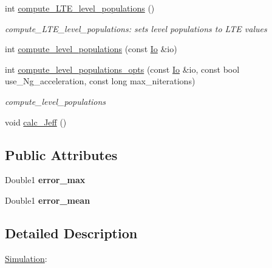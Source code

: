 \begin{DoxyCompactItemize}
\mbox{\label{structSimulation_a3049c252acbb537a7f7db6caf59520ec}} 
int \mbox{\hyperlink{structSimulation_a3049c252acbb537a7f7db6caf59520ec}{compute\+\_\+\+L\+T\+E\+\_\+level\+\_\+populations}} ()
\begin{DoxyCompactList}\small\item\em compute\+\_\+\+L\+T\+E\+\_\+level\+\_\+populations\+: sets level populations to L\+TE values \end{DoxyCompactList}\item 
int \mbox{\hyperlink{structSimulation_a32a1ff3404a290a95b9b3db2cbffba68}{compute\+\_\+level\+\_\+populations}} (const \mbox{\hyperlink{structIo}{Io}} \&io)
\item 
\mbox{\label{structSimulation_ae489db8cfd872f168b0dfd3519b3ec11}} 
int \mbox{\hyperlink{structSimulation_ae489db8cfd872f168b0dfd3519b3ec11}{compute\+\_\+level\+\_\+populations\+\_\+opts}} (const \mbox{\hyperlink{structIo}{Io}} \&io, const bool use\+\_\+\+Ng\+\_\+acceleration, const long max\+\_\+niterations)
\begin{DoxyCompactList}\small\item\em compute\+\_\+level\+\_\+populations \end{DoxyCompactList}\item 
void \mbox{\hyperlink{structSimulation_a8f68d28f188303845cab9e16f8512819}{calc\+\_\+\+Jeff}} ()
\end{DoxyCompactItemize}
\subsection*{Public Attributes}
\begin{DoxyCompactItemize}
\item 
\mbox{\label{structSimulation_a8f1af666ff7c205e94e555a799f51184}} 
Double1 {\bfseries error\+\_\+max}
\item 
\mbox{\label{structSimulation_a794b5063c84238e4fd563f58830b528b}} 
Double1 {\bfseries error\+\_\+mean}
\end{DoxyCompactItemize}


\subsection{Detailed Description}
\mbox{\hyperlink{structSimulation}{Simulation}}\+: 

